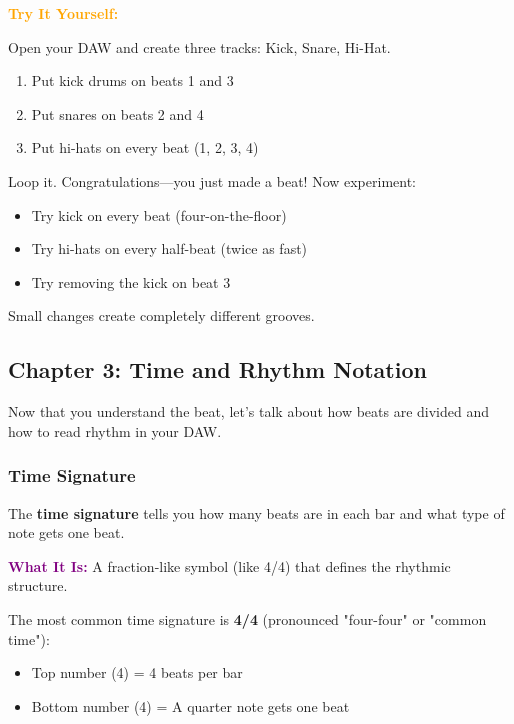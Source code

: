 \documentclass[11pt,letterpaper]{article}
\newcommand{\purple}[1]{\textcolor{purple}{\textbf{#1}}}
\newcommand{\orangetext}[1]{\textcolor{orange}{\textbf{#1}}}
\begin{document}
\textbf{\orangetext{Try It Yourself:}} 

Open your DAW and create three tracks: Kick, Snare, Hi-Hat.

\begin{enumerate}[leftmargin=*]
\item Put kick drums on beats 1 and 3
\item Put snares on beats 2 and 4  
\item Put hi-hats on every beat (1, 2, 3, 4)
\end{enumerate}

Loop it. Congratulations—you just made a beat! Now experiment:
\begin{itemize}[leftmargin=*]
\item Try kick on every beat (four-on-the-floor)
\item Try hi-hats on every half-beat (twice as fast)
\item Try removing the kick on beat 3
\end{itemize}

Small changes create completely different grooves.

\newpage


\subsection{Chapter 3: Time and Rhythm Notation}

Now that you understand the beat, let's talk about how beats are divided and how to read rhythm in your DAW.

\subsubsection{Time Signature}

The \textbf{time signature} tells you how many beats are in each bar and what type of note gets one beat.

\textbf{\purple{What It Is:}} A fraction-like symbol (like 4/4) that defines the rhythmic structure.

The most common time signature is \textbf{4/4} (pronounced "four-four" or "common time"):
\begin{itemize}[leftmargin=*]
\item Top number (4) = 4 beats per bar
\item Bottom number (4) = A quarter note gets one beat
\end{itemize}
\end{document}
